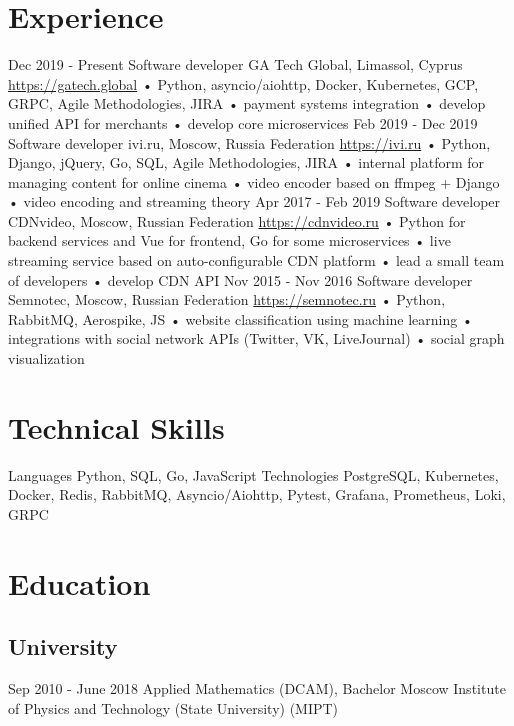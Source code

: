 \documentclass[11pt,a4paper]{moderncv}
\begin{document}
\maketitle

\section{Experience}
\cventry
  {Dec 2019 - Present}
  {Software developer}
  {GA Tech Global, Limassol, Cyprus}
  {\newline{}\url{https://gatech.global}}{}
  {
    • Python, asyncio/aiohttp, Docker, Kubernetes, GCP, GRPC, Agile Methodologies, JIRA\newline{}
    • payment systems integration\newline{}
    • develop unified API for merchants\newline{}
    • develop core microservices
  }
\cventry
  {Feb 2019 - Dec 2019}
  {Software developer}
  {ivi.ru, Moscow, Russia Federation}
  {\newline{}\url{https://ivi.ru}}{}
  {
    • Python, Django, jQuery, Go, SQL, Agile Methodologies, JIRA\newline{}
    • internal platform for managing content for online cinema\newline{}
    • video encoder based on ffmpeg + Django\newline{}
    • video encoding and streaming theory
   }
\cventry
  {Apr 2017 - Feb 2019}
  {Software developer}
  {CDNvideo, Moscow, Russian Federation}
  {\newline{}\url{https://cdnvideo.ru}}{}
  {
    • Python for backend services and Vue for frontend, Go for some microservices\newline{}
    • live streaming service based on auto-configurable CDN platform\newline{}
    • lead a small team of developers\newline{}
    • develop CDN API
   }
\cventry
  {Nov 2015 - Nov 2016}
  {Software developer}
  {Semnotec, Moscow, Russian Federation}
  {\newline{}\url{https://semnotec.ru}}{}
  {
    • Python, RabbitMQ, Aerospike, JS\newline{}
    • website classification using machine learning\newline{}
    • integrations with social network APIs (Twitter, VK, LiveJournal)\newline{}
    • social graph visualization
   }

\section{Technical Skills}
\cvline
  {Languages}{
    Python,
    SQL,
    Go,
    JavaScript
  }
\cvline
  {Technologies}{
    PostgreSQL,
    Kubernetes,
    Docker,
    Redis,
    RabbitMQ,
    Asyncio/Aiohttp,
    Pytest,
    Grafana,
    Prometheus,
    Loki,
    GRPC
  }

\section{Education}
  \subsection{University}
  \cventry
    {Sep 2010 - June 2018}
    {Applied Mathematics (DCAM), Bachelor}
    {Moscow Institute of Physics and Technology (State University) (MIPT)}
    {}{}{}
\end{document}
